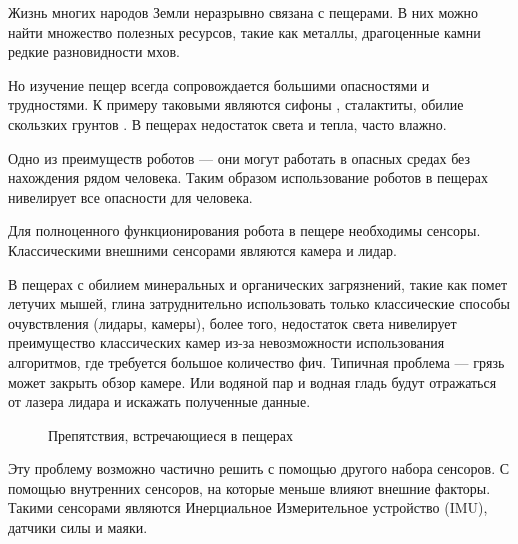 
{\actuality} Жизнь многих народов Земли неразрывно связана с пещерами. В них можно найти множество полезных ресурсов, такие как металлы, драгоценные камни редкие разновидности мхов.

Но изучение пещер всегда сопровождается большими опасностями и
трудностями. К примеру таковыми являются сифоны , сталактиты, обилие скользких
грунтов . В пещерах недостаток света и тепла, часто влажно.

Одно из преимуществ роботов --- они могут работать в опасных средах без нахождения рядом человека. Таким образом использование роботов в пещерах нивелирует все опасности для человека.

Для полноценного функционирования робота в пещере необходимы сенсоры. Классическими внешними сенсорами являются камера и лидар.

В пещерах с обилием минеральных и органических загрязнений, такие как помет летучих мышей, глина затруднительно использовать только классические способы очувствления (лидары, камеры), более того, недостаток света нивелирует преимущество классических камер из-за невозможности использования алгоритмов, где требуется большое количество фич. Типичная проблема --- грязь  может закрыть обзор камере. Или водяной пар и водная гладь  будут отражаться от лазера лидара и искажать полученные данные.

\begin{figure}[ht]
  \caption[Этот текст попадает в названия рисунков в списке рисунков]{Препятствия, встречающиеся в пещерах}\label{fig:obstacles}
\end{figure}
\vspace{-0.5cm}
Эту проблему возможно частично решить с помощью другого набора сенсоров. С помощью внутренних сенсоров, на которые меньше влияют внешние факторы. Такими сенсорами являются Инерциальное Измерительное устройство (IMU), датчики силы и маяки.


